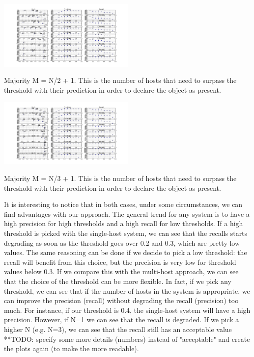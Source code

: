 \documentclass[10pt,conference,compsocconf]{IEEEtran}
\begin{document}
\begin{center}
	\captionsetup{type=figure}
	\includegraphics[width=0.5\textwidth]{img/summary_majority_HALF.png}
	\caption {Majority M = N/2 + 1. This is the number of hosts that need to surpass the threshold with their prediction in order to declare the object as present.}
	\label{fig:person_FP_FN_summary_majority2}
\end{center}
\begin{center}
	\captionsetup{type=figure}
	\includegraphics[width=0.5\textwidth]{img/summary_majority_THIRD.png}
	\caption {Majority M = N/3 + 1. This is the number of hosts that need to surpass the threshold with their prediction in order to declare the object as present.}
	\label{fig:person_FP_FN_summary_majority3}
\end{center}
It is interesting to notice that in both cases, under some circumstances, we can find advantages with our approach. The general trend for any system is to have a high precision for high thresholds and a high recall for low thresholds. If a high threshold is picked with the single-host system, we can see that the recalls starts degrading as soon as the threshold goes over 0.2 and 0.3, which are pretty low values. The same reasoning can be done if we decide to pick a low threshold: the recall will benefit from this choice, but the precision is very low for threshold values below 0.3.
If we compare this with the multi-host approach, we can see that the choice of the threshold can be more flexible. In fact, if we pick any threshold, we can see that if the number of hosts in the system is appropriate, we can improve the precision (recall) without degrading the recall (precision) too much.
For instance, if our threshold is 0.4, the single-host system will have a high precision. However, if N=1 we can see that the recall is degraded. If we pick a higher N (e.g. N=3), we can see that the recall still has an acceptable value **TODO: specify some more details (numbers) instead of "acceptable" and create the plots again (to make the more readable).
\end{document}
